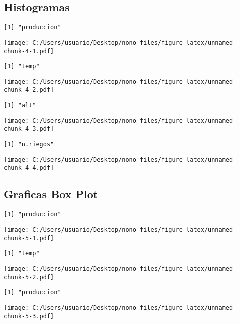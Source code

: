\documentclass[]{article}
\begin{document}
\pagebreak

\subsection{Histogramas}\label{histogramas}

\begin{verbatim}
[1] "produccion"
\end{verbatim}

\texttt{[image: C:/Users/usuario/Desktop/nono\_files/figure-latex/unnamed-chunk-4-1.pdf]}

\begin{verbatim}
[1] "temp"
\end{verbatim}

\texttt{[image: C:/Users/usuario/Desktop/nono\_files/figure-latex/unnamed-chunk-4-2.pdf]}

\begin{verbatim}
[1] "alt"
\end{verbatim}

\texttt{[image: C:/Users/usuario/Desktop/nono\_files/figure-latex/unnamed-chunk-4-3.pdf]}

\begin{verbatim}
[1] "n.riegos"
\end{verbatim}

\texttt{[image: C:/Users/usuario/Desktop/nono\_files/figure-latex/unnamed-chunk-4-4.pdf]}

\subsection{Graficas Box Plot}\label{graficas-box-plot}

\begin{verbatim}
[1] "produccion"
\end{verbatim}

\texttt{[image: C:/Users/usuario/Desktop/nono\_files/figure-latex/unnamed-chunk-5-1.pdf]}

\begin{verbatim}
[1] "temp"
\end{verbatim}

\texttt{[image: C:/Users/usuario/Desktop/nono\_files/figure-latex/unnamed-chunk-5-2.pdf]}

\begin{verbatim}
[1] "produccion"
\end{verbatim}

\texttt{[image: C:/Users/usuario/Desktop/nono\_files/figure-latex/unnamed-chunk-5-3.pdf]}
\end{document}

